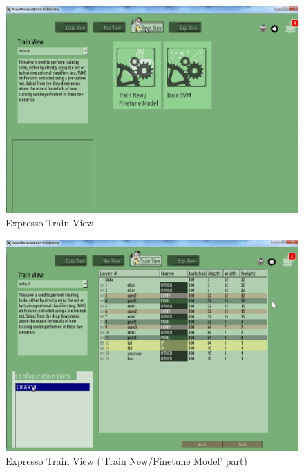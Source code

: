 \begin{figure}[!ht]
\center
    \includegraphics[scale=0.9]{images_expresso/05_train.png}
    \caption{Expresso Train View}
\end{figure}

\begin{figure}[!ht]
\center
    \includegraphics[scale=0.9]{images_expresso/06_train_new.png}
    \caption{Expresso Train View ('Train New/Finetune Model' part)}
\end{figure}

